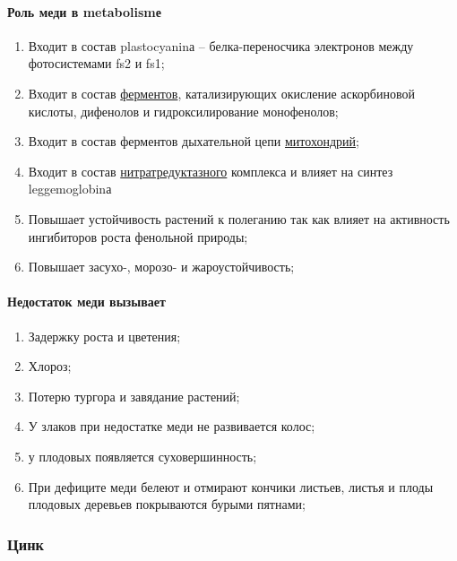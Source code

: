 \paragraph*{Роль меди в \gls{metabolism}е}

\begin{enumerate}
\item Входит в состав \gls{plastocyanin}а -- белка-переносчика электронов между фотосистемами \gls{fs2} и \gls{fs1};
\item Входит в состав \hyperlink{enzimes}{ферментов}, катализирующих окисление аскорбиновой кислоты, дифенолов и гидроксилирование монофенолов;
\item Входит в состав ферментов дыхательной цепи \hyperlink{mitohondria}{митохондрий};
\item Входит в состав \hyperlink{nitritreductaza}{нитратредуктазного} комплекса и влияет на синтез \gls{leggemoglobin}а
\item Повышает устойчивость растений к полеганию так как влияет на активность ингибиторов роста фенольной природы;
\item Повышает засухо-, морозо- и жароустойчивость;
\end{enumerate}

\paragraph*{Недостаток меди вызывает} 

\begin{enumerate}
	\item Задержку роста и цветения;
	\item Хлороз;
	\item Потерю тургора и завядание растений;
	\item У злаков при недостатке меди не развивается колос;
	\item у плодовых появляется суховершинность;
	\item При дефиците меди белеют и отмирают кончики листьев, листья и плоды плодовых деревьев покрываются бурыми пятнами;
\end{enumerate}

\subsubsection*{Цинк}


